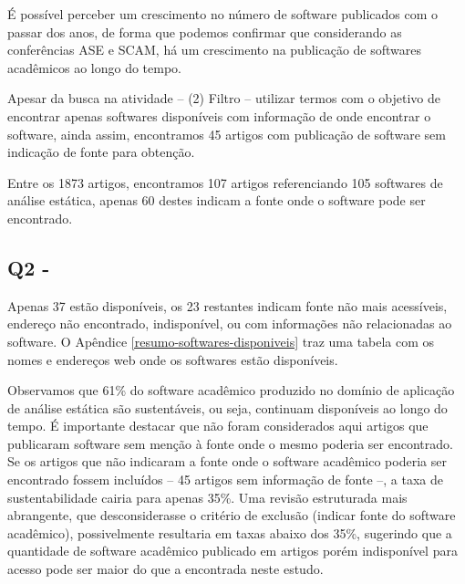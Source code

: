 É possível perceber um crescimento no número de software publicados com o
passar dos anos, de forma que podemos confirmar que considerando as
conferências ASE e SCAM, há um crescimento na publicação de softwares
acadêmicos ao longo do tempo.

Apesar da busca na atividade -- (2) Filtro -- utilizar termos com o objetivo de
encontrar apenas softwares disponíveis com informação de onde encontrar o
software, ainda assim, encontramos 45 artigos com publicação de software sem
indicação de fonte para obtenção.

Entre os 1873 artigos, encontramos 107 artigos referenciando 105 softwares de
análise estática, apenas 60 destes indicam a fonte onde o software pode ser
encontrado.


\subsection{Q2 - \EstudoUmQuestaoDois} %


Apenas 37 estão disponíveis, os 23 restantes indicam fonte não mais
acessíveis, endereço não encontrado, indisponível, ou com informações não
relacionadas ao software. 
O Apêndice \ref{resumo-softwares-disponiveis} traz
uma tabela com os nomes e endereços web onde os softwares estão disponíveis.

Observamos que 61\% do software acadêmico produzido no domínio de aplicação de análise estática 
são sustentáveis, ou seja, continuam disponíveis ao longo do tempo. 
É importante destacar que não foram considerados aqui artigos que publicaram software 
sem menção à fonte onde o mesmo poderia ser encontrado.
Se os artigos que não indicaram a fonte onde o software acadêmico poderia ser encontrado
fossem incluídos -- 45 artigos sem informação de fonte --, 
a taxa de sustentabilidade cairia para apenas 35\%.
Uma revisão estruturada mais abrangente, que desconsiderasse o critério de exclusão
(indicar fonte do software acadêmico), possivelmente resultaria em taxas abaixo dos 35\%, 
sugerindo que a quantidade de software acadêmico publicado em artigos porém indisponível para acesso
pode ser maior do que a encontrada neste estudo.

